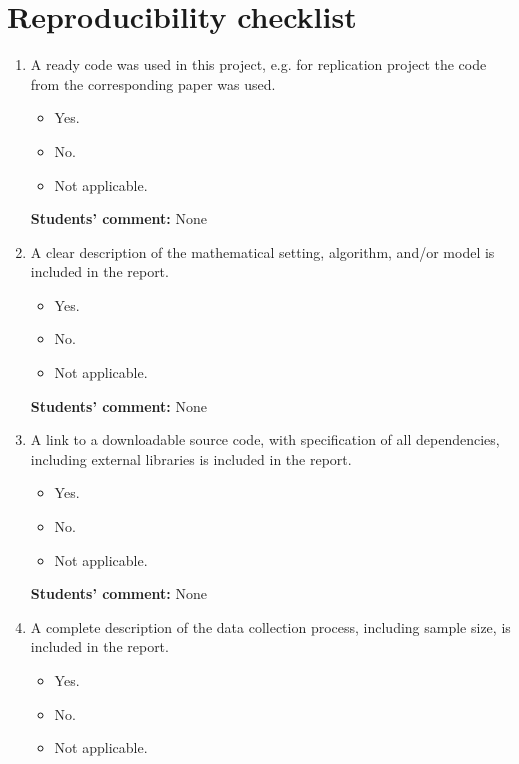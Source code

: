 \documentclass{article}
\begin{document}
\newpage
\section{Reproducibility checklist}
\label{appendix-checklist}

    \begin{enumerate}
    \item A ready code was used in this project, e.g. for replication project the code from the corresponding paper was used.
    \begin{itemize}
        \item [\faSquareO] Yes.
        \item [\faCheckSquareO] No.
        \item [\faSquareO] Not applicable.
    \end{itemize}
    
    \textbf{Students' comment:} None
    \item A clear description of the mathematical setting, algorithm, and/or model is included in the report.
    \begin{itemize}
        \item [\faCheckSquareO] Yes.
        \item [\faSquareO] No.
        \item [\faSquareO] Not applicable.
    \end{itemize}
    
    \textbf{Students' comment:} None
    
    \item A link to a downloadable source code, with specification of all dependencies, including external libraries is included in the report.
    \begin{itemize}
        \item [\faCheckSquareO] Yes.
        \item [\faSquareO] No.
        \item [\faSquareO] Not applicable.
    \end{itemize}
    
    \textbf{Students' comment:} None
    
    \item A complete description of the data collection process, including sample size, is included in the report.
    \begin{itemize}
        \item [\faCheckSquareO] Yes.
        \item [\faSquareO] No.
        \item [\faSquareO] Not applicable.
    \end{itemize}
    

\end{enumerate}
\end{document}

